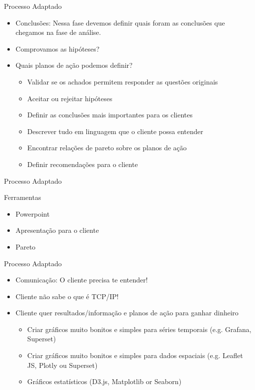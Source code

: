 \begin{frame}
	\begin{block}{Processo Adaptado}
		\begin{itemize}
		\item Conclusões: Nessa fase devemos definir quais foram as conclusões que chegamos na fase de análise.
		\item Comprovamos as hipóteses?
		\item Quais planos de ação podemos definir?
		
				\begin{itemize}
					\item Validar se os achados permitem responder as questões originais
					\item Aceitar ou rejeitar hipóteses
					\item Definir as conclusões mais importantes para os clientes
					\item Descrever tudo em linguagem que o cliente possa entender
					\item Encontrar relações de pareto sobre os planos de ação
					\item Definir recomendações para o cliente					
				\end{itemize}		
		\end{itemize}
	\end{block}
\end{frame}

    
\begin{frame}
	\begin{block}{Processo Adaptado}
	
		Ferramentas
		\begin{itemize}
			\item Powerpoint
			\item Apresentação para o cliente
			\item Pareto
		\end{itemize}
	\end{block}
\end{frame}



\begin{frame}
	\begin{block}{Processo Adaptado}
		\begin{itemize}
		\item Comunicação: O cliente precisa te entender!
		\item Cliente não sabe o que é TCP/IP!
		\item Cliente quer resultados/informação e planos de ação para ganhar dinheiro
				\begin{itemize}
					\item Criar gráficos muito bonitos e simples para séries temporais (e.g. Grafana, Superset)
					\item Criar gráficos muito bonitos e simples para dados espaciais (e.g. Leaflet JS, Plotly ou Superset)
					\item Gráficos estatísticos (D3.js, Matplotlib or Seaborn)
					
				\end{itemize}		
		\end{itemize}
	\end{block}
\end{frame}


